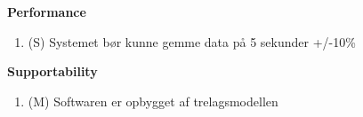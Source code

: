 \textbf{Performance}\\
\begin{enumerate}
	\item (S) Systemet bør kunne gemme data på 5 sekunder +/-10\%\\
\end{enumerate}

\textbf{Supportability}\\
\begin{enumerate}
	\item (M) Softwaren er opbygget af trelagsmodellen\\
\end{enumerate}




















